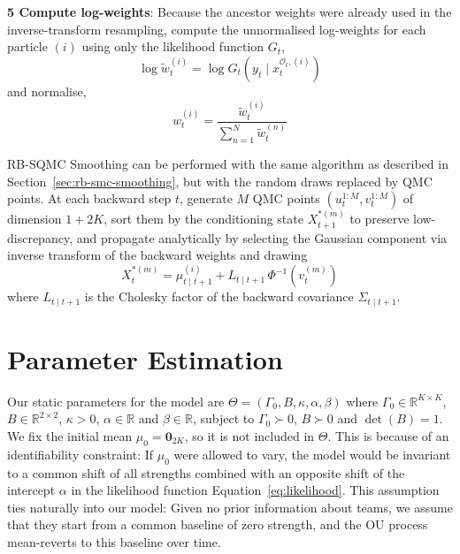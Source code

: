 \textbf{5 Compute log-weights}: Because the ancestor weights were already used in the inverse-transform resampling, compute the unnormalised log-weights for each particle $(i)$ using only the likelihood function $G_t$,
\begin{equation}
    \log \tilde{w}_t^{(i)} = \log G_t\left( y_t \mid x_t^{\mathcal{O}_t,(i)} \right) \nonumber
\end{equation}
and normalise,
\begin{equation}
    w_t^{(i)} = \frac{\tilde{w}_t^{(i)}}{\sum_{n=1}^N \tilde{w}_t^{(n)}} \nonumber
\end{equation}

RB-SQMC Smoothing can be performed with the same algorithm as described in Section~\ref{sec:rb-smc-smoothing}, but with the random draws replaced by QMC points. At each backward step $t$, generate $M$ QMC points $(u_t^{1:M}, v_t^{1:M})$ of dimension $1 + 2K$, sort them by the conditioning state $X_{t+1}^{*(m)}$ to preserve low-discrepancy, and propagate analytically by selecting the Gaussian component via inverse transform of the backward weights and drawing
\begin{equation}
    X_t^{*(m)} = \mu_{t \mid t+1}^{(i)} + L_{t \mid t+1}\, \Phi^{-1}\left( v_t^{(m)} \right) \nonumber
\end{equation}
where $L_{t \mid t+1}$ is the Cholesky factor of the backward covariance $\Sigma_{t \mid t+1}$.


\section{Parameter Estimation}
\label{sec:parameter-estimation}

Our static parameters for the model are $\Theta = (\Gamma_0, B, \kappa, \alpha, \beta)$ where $\Gamma_0 \in \mathbb{R}^{K \times K}$, $B \in \mathbb{R}^{2 \times 2}$, $\kappa > 0$, $\alpha \in \mathbb{R}$ and $\beta \in \mathbb{R}$, subject to $\Gamma_0 \succ 0$, $B \succ 0$ and $\det(B) = 1$. We fix the initial mean $\mu_0 = \mathbf{0}_{2K}$, so it is not included in $\Theta$. This is because of an identifiability constraint: If $\mu_0$ were allowed to vary, the model would be invariant to a common shift of all strengths combined with an opposite shift of the intercept $\alpha$ in the likelihood function Equation~\eqref{eq:likelihood}. This assumption ties naturally into our model: Given no prior information about teams, we assume that they start from a common baseline of zero strength, and the OU process mean-reverts to this baseline over time.

